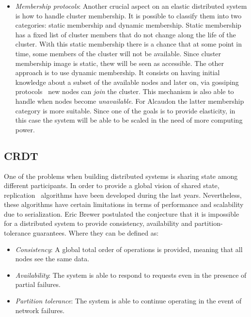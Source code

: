 \begin{itemize}
\item \textit{Membership protocols}: Another crucial aspect on an elastic
  distributed system is how to handle cluster membership. It is possible to
  classify them into two categories: static membership and dynamic membership.
  Static membership has a fixed list of cluster members that do not change along
  the life of the cluster. With this static membership there is a chance that at
  some point in time, some members of the cluster will not be available. Since
  cluster membership image is static, thew will be seen as accessible. The other
  approach is to use dynamic membership. It consists on having initial knowledge
  about a subset of the available nodes and later on, via gossiping
  protocols~\cite{gossip} new nodes can \textit{join} the cluster. This mechanism
  is also able to handle when nodes become \textit{unavailable}. For Alcaudon
  the latter membership category is more suitable. Since one of the goals is to
  provide elasticity, in this case the system will be able to be scaled in the
  need of more computing power.
\end{itemize}

\subsection{CRDT}

One of the problems when building distributed systems is sharing state among
different participants. In order to provide a global vision of shared state,
replication~\cite{book:replication} algorithms have been developed during the last
years. Nevertheless, these algorithms have certain limitations in terms of
performance and scalability due to serialization. Eric Brewer postulated the
conjecture that it is impossible for a distributed system to provide
consistency, availability and partition-tolerance guarantees. Where
they can be defined as:

\begin{itemize}
\item \textit{Consistency}: A global total order of operations is provided,
  meaning that all nodes see the same data.
\item \textit{Availability}: The system is able to respond to requests even in
  the presence of partial failures.
\item \textit{Partition tolerance}: The system is able to continue operating in
  the event of network failures.
\end{itemize}

